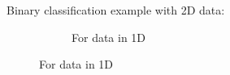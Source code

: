 \begin{frame}

Binary classification example with 2D data:

\begin{figure}[ht]
     \centering
     \begin{subfigure}[t]{0.3\textwidth}
         \centering
         \usebox{\imagebox}%
         \caption{For data in 1D}
         \label{fig:quadratic}
     \end{subfigure}
     \hspace{2mm}
\end{figure}



\end{frame}
